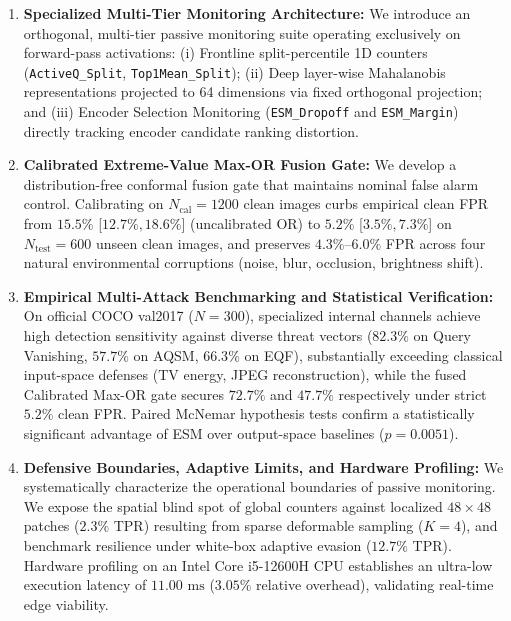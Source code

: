 \documentclass[preprint,12pt]{elsarticle}
\begin{document}
\begin{enumerate}
    \item \textbf{Specialized Multi-Tier Monitoring Architecture:} We introduce an orthogonal, multi-tier passive monitoring suite operating exclusively on forward-pass activations: (i) Frontline split-percentile 1D counters (\texttt{ActiveQ\_Split}, \texttt{Top1Mean\_Split}); (ii) Deep layer-wise Mahalanobis representations projected to 64 dimensions via fixed orthogonal projection; and (iii) Encoder Selection Monitoring (\texttt{ESM\_Dropoff} and \texttt{ESM\_Margin}) directly tracking encoder candidate ranking distortion.
    \item \textbf{Calibrated Extreme-Value Max-OR Fusion Gate:} We develop a distribution-free conformal fusion gate that maintains nominal false alarm control. Calibrating on $N_{\mathrm{cal}}=1200$ clean images curbs empirical clean FPR from $15.5\%$ [$12.7\%, 18.6\%$] (uncalibrated OR) to $5.2\%$ [$3.5\%, 7.3\%$] on $N_{\mathrm{test}}=600$ unseen clean images, and preserves $4.3\%$--$6.0\%$ FPR across four natural environmental corruptions (noise, blur, occlusion, brightness shift).
    \item \textbf{Empirical Multi-Attack Benchmarking and Statistical Verification:} On official COCO val2017 ($N=300$), specialized internal channels achieve high detection sensitivity against diverse threat vectors ($82.3\%$ on Query Vanishing, $57.7\%$ on AQSM, $66.3\%$ on EQF), substantially exceeding classical input-space defenses (TV energy, JPEG reconstruction), while the fused Calibrated Max-OR gate secures $72.7\%$ and $47.7\%$ respectively under strict $5.2\%$ clean FPR. Paired McNemar hypothesis tests confirm a statistically significant advantage of ESM over output-space baselines ($p = 0.0051$).
    \item \textbf{Defensive Boundaries, Adaptive Limits, and Hardware Profiling:} We systematically characterize the operational boundaries of passive monitoring. We expose the spatial blind spot of global counters against localized $48\times 48$ patches ($2.3\%$ TPR) resulting from sparse deformable sampling ($K=4$), and benchmark resilience under white-box adaptive evasion ($12.7\%$ TPR). Hardware profiling on an Intel Core i5-12600H CPU establishes an ultra-low execution latency of $11.00\text{ ms}$ ($3.05\%$ relative overhead), validating real-time edge viability.
\end{enumerate}

\end{document}
